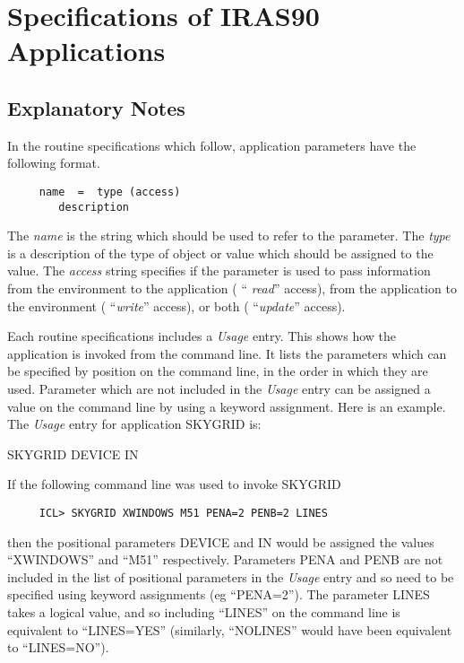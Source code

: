 \section{Specifications of IRAS90 Applications}
\label{ap:full}
\subsection{Explanatory Notes}

In the routine specifications which follow, application parameters have the
following format.

\begin{verbatim}
     name  =  type (access)
        description
\end{verbatim}

The {\em name} is the string which should be used to refer to the parameter. The
{\em type} is a description of the type of object or value which should be
assigned to the value. The {\em access} string specifies if the parameter is
used to pass information from the environment to the application ( ``{\em
read}'' access), from the application to the environment ( ``{\em write}''
access), or both ( ``{\em update}'' access).

Each routine specifications includes a {\em Usage\/} entry.  This shows how the
application is invoked from the command line.   It lists the parameters which
can be specified by position on the command line, in the order in which they
are used. Parameter which are not included in the {\em Usage\/} entry can be
assigned a value on the command line by using a keyword assignment. Here is an
example. The {\em Usage\/} entry for application SKYGRID is:

\bigskip

{\ssttt \hspace*{1.0em}
        SKYGRID DEVICE IN
}

If the following command line was used to invoke SKYGRID

\small
\begin{verbatim}
     ICL> SKYGRID XWINDOWS M51 PENA=2 PENB=2 LINES
\end{verbatim}
\normalsize

then the positional parameters DEVICE and IN would be assigned the values
``XWINDOWS'' and ``M51'' respectively. Parameters PENA and PENB are not included
in the list of positional parameters in the {\em Usage\/} entry and so need to
be specified using keyword assignments (eg ``PENA=2''). The parameter LINES
takes a logical value, and so including ``LINES'' on the command line is
equivalent to ``LINES=YES'' (similarly, ``NOLINES'' would have been equivalent
to ``LINES=NO'').

